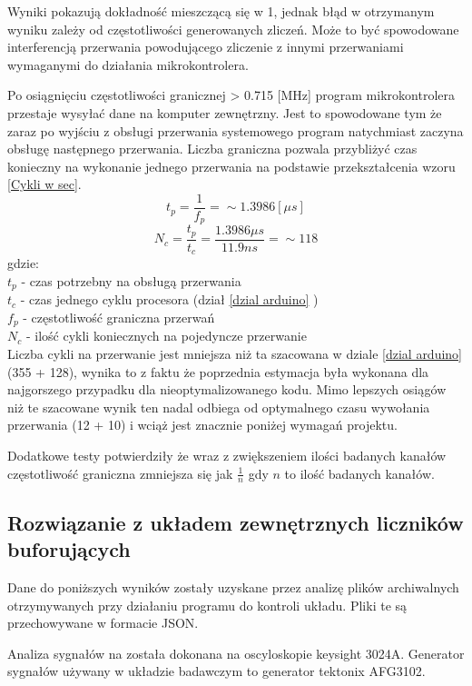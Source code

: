Wyniki pokazują dokładność mieszczącą się w  1\textperthousand, 
jednak błąd w otrzymanym wyniku zależy od częstotliwości generowanych zliczeń.
Może to być spowodowane interferencją przerwania powodującego zliczenie z innymi przerwaniami wymaganymi do działania mikrokontrolera.

Po osiągnięciu częstotliwości granicznej > 0.715 [MHz] program mikrokontrolera przestaje wysyłać dane na komputer zewnętrzny.
Jest to spowodowane tym że zaraz po wyjściu z obsługi przerwania systemowego program natychmiast zaczyna obsługę następnego przerwania. 
Liczba graniczna pozwala przybliżyć czas konieczny na wykonanie jednego przerwania na podstawie przekształcenia wzoru \ref{Cykli w sec}. 
$$ t_p = \frac{1}{f_p} = \sim 1.3986 [\mu s] $$
$$ N_c = \frac{t_p}{t_c} =  \frac{1.3986 \mu s}{11.9 ns} =\sim 118$$
gdzie: \\
        \indent $t_p$ -  czas potrzebny na obsługą przerwania\\
        \indent $t_c$ -  czas jednego cyklu procesora (dział \ref{dzial arduino} ) \\
        \indent $f_p$ -  częstotliwość graniczna przerwań \\
        \indent $N_c$ -  ilość cykli koniecznych na pojedyncze przerwanie \\

Liczba cykli na przerwanie jest mniejsza niż ta szacowana w dziale \ref{dzial arduino} (355 + 128)\cite{ard_opt_git}, wynika to z faktu że poprzednia estymacja była wykonana dla najgorszego przypadku dla nieoptymalizowanego kodu.
Mimo lepszych osiągów niż te szacowane wynik ten nadal odbiega od optymalnego czasu wywołania przerwania (12 + 10) \cite{interupt latency} i wciąż jest znacznie poniżej wymagań projektu. 

Dodatkowe testy potwierdziły że wraz z zwiększeniem ilości badanych kanałów częstotliwość graniczna zmniejsza się jak $\frac{1}{n}$ gdy $n$ to ilość badanych kanałów. 

\subsection{Rozwiązanie z układem zewnętrznych liczników buforujących}

Dane do poniższych wyników zostały uzyskane przez analizę plików archiwalnych otrzymywanych przy działaniu programu do kontroli układu.
Pliki te są przechowywane w formacie JSON.

Analiza sygnałów na została dokonana na oscyloskopie keysight 3024A. Generator sygnałów używany w układzie badawczym to generator tektonix AFG3102.

